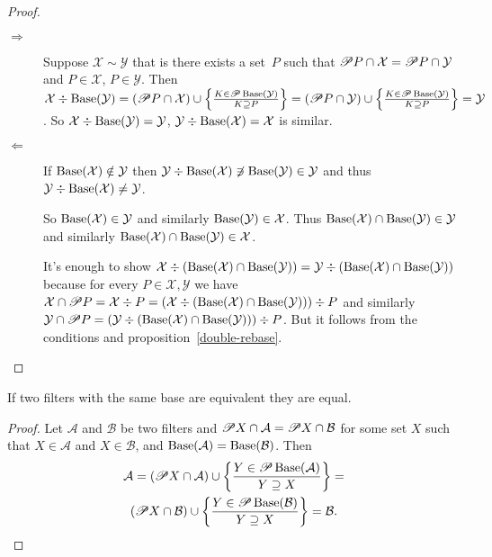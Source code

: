 \begin{proof}
~
\begin{description}
\item[$\Rightarrow$] Suppose $\mathcal{X}\sim\mathcal{Y}$
that is there exists a set~$P$ such that
$\mathscr{P} P\cap\mathcal{X}=\mathscr{P} P\cap\mathcal{Y}$ and
$P\in\mathcal{X}$, $P\in\mathcal{Y}$. Then
$\mathcal{X}\div\operatorname{Base}(\mathcal{Y}) =
(\mathscr{P} P\cap\mathcal{X})\cup
\left\{ \frac{K\in\mathscr{P}\operatorname{Base}(\mathcal{Y})}{K\supseteq P}\right\} =
(\mathscr{P} P\cap\mathcal{Y})\cup
\left\{ \frac{K\in\mathscr{P}\operatorname{Base}(\mathcal{Y})}{K\supseteq P}\right\} =
\mathcal{Y}$. So
$\mathcal{X}\div\operatorname{Base}(\mathcal{Y}) = \mathcal{Y}$,
$\mathcal{Y}\div\operatorname{Base}(\mathcal{X}) = \mathcal{X}$ is similar.

\item[$\Leftarrow$] If $\operatorname{Base}(\mathcal{X})\notin\mathcal{Y}$ then
$\mathcal{Y}\div\operatorname{Base}(\mathcal{X})\not\ni\operatorname{Base}(\mathcal{Y})\in\mathcal{Y}$ and thus
$\mathcal{Y}\div\operatorname{Base}(\mathcal{X})\ne\mathcal{Y}$.

So $\operatorname{Base}(\mathcal{X})\in\mathcal{Y}$ and similarly
$\operatorname{Base}(\mathcal{Y})\in\mathcal{X}$. Thus
$\operatorname{Base}(\mathcal{X})\cap\operatorname{Base}(\mathcal{Y})\in\mathcal{Y}$
and similarly
$\operatorname{Base}(\mathcal{X})\cap\operatorname{Base}(\mathcal{Y})\in\mathcal{X}$.

It's enough to show
$\mathcal{X}\div(\operatorname{Base}(\mathcal{X})\cap\operatorname{Base}(\mathcal{Y})) =
\mathcal{Y}\div(\operatorname{Base}(\mathcal{X})\cap\operatorname{Base}(\mathcal{Y}))$
because for every $P\in\mathcal{X},\mathcal{Y}$ we have $\mathcal{X}\cap\mathscr{P} P = \mathcal{X}\div P =
(\mathcal{X}\div(\operatorname{Base}(\mathcal{X})\cap\operatorname{Base}(\mathcal{Y})))\div P$ and similarly $\mathcal{Y}\cap\mathscr{P} P =
(\mathcal{Y}\div(\operatorname{Base}(\mathcal{X})\cap\operatorname{Base}(\mathcal{Y})))\div P$. But it follows from the conditions and
proposition~\ref{double-rebase}.
\end{description}
\end{proof}

\begin{prop}
If two filters with the same base are equivalent they are equal.\end{prop}
\begin{proof}
Let $\mathcal{A}$ and $\mathcal{B}$ be two filters and $\mathscr{P} X\cap\mathcal{A}=\mathscr{P} X\cap\mathcal{B}$
for some set $X$ such that $X\in\mathcal{A}$ and $X\in\mathcal{B}$,
and $\operatorname{Base}(\mathcal{A})=\operatorname{Base}(\mathcal{B})$. Then
\begin{multline*}
\mathcal{A}=(\mathscr{P} X\cap\mathcal{A})\cup\left\{ \frac{Y\in\mathscr{P}\operatorname{Base}(\mathcal{A})}{Y\supseteq X}\right\}=\\
(\mathscr{P} X\cap\mathcal{B})\cup\left\{ \frac{Y\in\mathscr{P}\operatorname{Base}(\mathcal{B})}{Y\supseteq X}\right\}=\mathcal{B}.
\end{multline*}
\end{proof}

